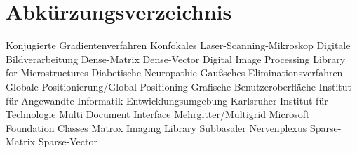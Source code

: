 \chapter*{Abkürzungsverzeichnis}
\begin{acronym}[DIPLOM]
					{Konjugierte Gradientenverfahren}
					{Konfokales Laser-Scanning-Mikroskop}
					{Digitale Bildverarbeitung}
					{Dense-Matrix}
					{Dense-Vector}
				{Digital Image Processing Library for Microstructures}
					{Diabetische Neuropathie}
					{Gaußsches Eliminationsverfahren}
					{Globale-Positionierung/Global-Positioning}
					{Grafische Benutzeroberfläche }
	 				{Institut für Angewandte Informatik}
					{Entwicklungsumgebung}
			 		{Karlsruher Institut für Technologie}
					{Multi Document Interface}
					{Mehrgitter/Multigrid}
					{Microsoft Foundation Classes}
					{Matrox Imaging Library}
					{Subbasaler Nervenplexus}
					{Sparse-Matrix}
					{Sparse-Vector}
\end{acronym}